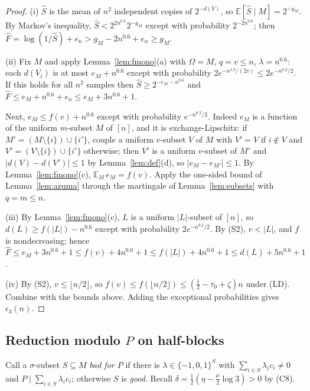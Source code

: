 \documentclass[11pt]{article}
\theoremstyle{definition}
\newcommand{\E}{\mathbb E}
\newcommand{\abs}[1]{\lvert #1\rvert}
\newcommand{\floor}[1]{\lfloor #1\rfloor}
\begin{document}
\begin{proof}
(i) $\hat S$ is the mean of $n^2$ independent copies of $2^{-d(V)}$, so $\E[\hat S\mid M]=2^{-g_M}$. By Markov's
inequality, $\hat S<2^{2n^{0.6}}2^{-g_M}$ except with probability $2^{-2n^{0.6}}$; then
$\hat F=\log(1/\hat S)+e_n>g_M-2n^{0.6}+e_n\ge g_M$.

(ii) Fix $M$ and apply Lemma~\ref{lem:fmono}(a) with $\Omega=M$, $q=v\le n$, $\lambda=n^{0.6}$: each $d(V_i)$ is at
most $e_M+n^{0.6}$ except with probability $2e^{-n^{1.2}/(2v)}\le2e^{-n^{0.2}/2}$. If this holds for all $n^2$
samples then $\hat S\ge2^{-e_M-n^{0.6}}$ and $\hat F\le e_M+n^{0.6}+e_n\le e_M+3n^{0.6}+1$.

Next, $e_M\le f(v)+n^{0.6}$ except with probability $e^{-n^{0.2}/2}$. Indeed $e_M$ is a function of the uniform
$m$-subset $M$ of $[n]$, and it is exchange-Lipschitz: if $M'=(M\setminus\{i\})\cup\{i'\}$, couple a uniform
$v$-subset $V$ of $M$ with $V'=V$ if $i\notin V$ and $V'=(V\setminus\{i\})\cup\{i'\}$ otherwise; then $V'$ is a
uniform $v$-subset of $M'$ and $\abs{d(V)-d(V')}\le1$ by Lemma~\ref{lem:def}(d), so $\abs{e_M-e_{M'}}\le1$. By
Lemma~\ref{lem:fmono}(c), $\E_M\,e_M=f(v)$. Apply the one-sided bound of Lemma~\ref{lem:azuma} through the
martingale of Lemma~\ref{lem:subsets} with $q=m\le n$.

(iii) By Lemma~\ref{lem:fmono}(c), $L$ is a uniform $\abs L$-subset of $[n]$, so $d(L)\ge f(\abs L)-n^{0.6}$ except
with probability $2e^{-n^{0.2}/2}$. By \textup{(S2)}, $v<\abs L$, and $f$ is nondecreasing; hence
$\hat F\le e_M+3n^{0.6}+1\le f(v)+4n^{0.6}+1\le f(\abs L)+4n^{0.6}+1\le d(L)+5n^{0.6}+1$.

(iv) By \textup{(S2)}, $v\le\floor{n/2}$, so $f(v)\le f(\floor{n/2})\le(\tfrac12-\tau_0+\zeta)n$ under \textup{(LD)}.
Combine with the bounds above. Adding the exceptional probabilities gives $\epsilon_3(n)$.
\end{proof}

\subsection{Reduction modulo $P$ on half-blocks}
Call a $\sigma$-subset $S\subseteq M$ \emph{bad for $P$} if there is $\lambda\in\{-1,0,1\}^S$ with
$\sum_{i\in S}\lambda_ic_i\ne0$ and $P\mid\sum_{i\in S}\lambda_ic_i$; otherwise $S$ is \emph{good}. Recall
$\delta=\tfrac12(\eta-\tfrac\mu2\log3)>0$ by \textup{(C8)}.
\end{document}
